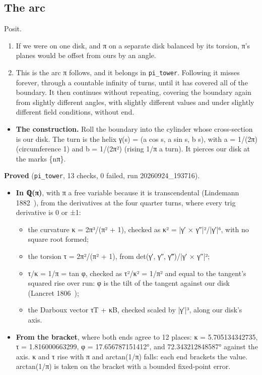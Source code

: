 \subsection{\texorpdfstring{The arc}{The arc}}

Posit.

\begin{enumerate}
\item If we were on one disk, and π on a separate disk balanced by its torsion, π's planes would be offset from ours by an angle.
\item This is the arc π follows, and it belongs in \texttt{pi\_\allowbreak{}tower}. Following it misses forever, through a countable infinity of turns, until it has covered all of the boundary. It then continues without repeating, covering the boundary again from slightly different angles, with slightly different values and under slightly different field conditions, without end.
\end{enumerate}

\begin{itemize}
\item \textbf{The construction.} Roll the boundary into the cylinder whose cross-section is our disk. The turn is the helix γ(s) = (a cos s, a sin s, b s), with a = 1/(2π) (circumference 1) and b = 1/(2π²) (rising 1/π a turn). It pierces our disk at the marks \{nπ\}.
\end{itemize}

\textbf{Proved} (\texttt{pi\_\allowbreak{}tower}, 13 checks, 0 failed, run 20260924\_\allowbreak{}193716).

\begin{itemize}
\item \textbf{In ℚ(π)}, with π a free variable because it is transcendental (Lindemann 1882~\cite{src:Lindemann-1882}), from the derivatives at the four quarter turns, where every trig derivative is 0 or ±1:

\begin{itemize}
\item the curvature κ = 2π³/(π² + 1), checked as κ² = |γ′ × γ″|²/|γ′|⁶, with no square root formed;
\item the torsion τ = 2π²/(π² + 1), from det(γ′, γ″, γ‴)/|γ′ × γ″|²;
\item τ/κ = 1/π = tan φ, checked as τ²/κ² = 1/π² and equal to the tangent's squared rise over run: φ is the tilt of the tangent against our disk (Lancret 1806~\cite{src:Lancret-1806});
\item the Darboux vector τT + κB, checked scaled by |γ′|³, along our disk's axis.
\end{itemize}
\item \textbf{From the bracket}, where both ends agree to 12 places: κ = 5.705134342735, τ = 1.816000663299, φ = 17.656787151412°, and 72.343212848587° against the axis. κ and τ rise with π and arctan(1/π) falls: each end brackets the value. arctan(1/π) is taken on the bracket with a bounded fixed-point error.
\end{itemize}

